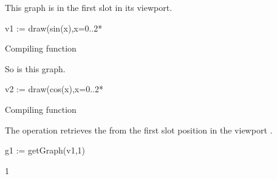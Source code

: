 \begin{xtc}
\begin{xtccomment}
This graph is in the first slot in its viewport.
\end{xtccomment}
\begin{spadsrc}
v1 := draw(sin(x),x=0..2*%
\end{spadsrc}
\begin{MessageOutput}
   Compiling function %
\end{MessageOutput}
\begin{TeXOutput}
\begin{fricasmath}{1}
%
\end{fricasmath}
\end{TeXOutput}
\end{xtc}
\begin{xtc}
\begin{xtccomment}
So is this graph.
\end{xtccomment}
\begin{spadsrc}
v2 := draw(cos(x),x=0..2*%
\end{spadsrc}
\begin{MessageOutput}
   Compiling function %
\end{MessageOutput}
\begin{TeXOutput}
\begin{fricasmath}{2}
%
\end{fricasmath}
\end{TeXOutput}
\end{xtc}
\begin{xtc}
\begin{xtccomment}
The operation 
retrieves the   from the first slot position
in the viewport .
\end{xtccomment}
\begin{spadsrc}
g1 := getGraph(v1,1) 
\end{spadsrc}
\begin{TeXOutput}
\begin{fricasmath}{3}
1%
\end{fricasmath}
\end{TeXOutput}
\end{xtc}
